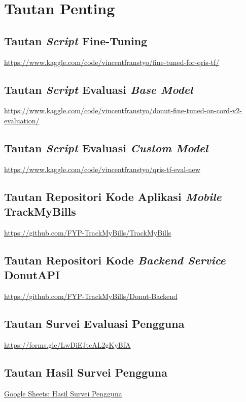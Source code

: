 \chapter{Tautan Penting}
\label{chapter:tautan-penting}

\section{Tautan \emph{Script} Fine-Tuning}
\href{https://www.kaggle.com/code/vincentfranstyo/fine-tuned-for-qris-tf/}{https://www.kaggle.com/code/vincentfranstyo/fine-tuned-for-qris-tf/}

\section{Tautan \emph{Script} Evaluasi \emph{Base Model}}
\href{https://www.kaggle.com/code/vincentfranstyo/donut-fine-tuned-on-cord-v2-evaluation/}{https://www.kaggle.com/code/vincentfranstyo/donut-fine-tuned-on-cord-v2-evaluation/}

\section{Tautan \emph{Script} Evaluasi \emph{Custom Model}}
\href{https://www.kaggle.com/code/vincentfranstyo/qris-tf-eval-new}{https://www.kaggle.com/code/vincentfranstyo/qris-tf-eval-new}

\section{Tautan Repositori Kode Aplikasi \emph{Mobile} TrackMyBills}
\href{https://github.com/FYP-TrackMyBills/TrackMyBills}{https://github.com/FYP-TrackMyBills/TrackMyBills}

\section{Tautan Repositori Kode \emph{Backend Service} DonutAPI}
\href{https://github.com/FYP-TrackMyBills/Donut-Backend}
{https://github.com/FYP-TrackMyBills/Donut-Backend}

\section{Tautan Survei Evaluasi Pengguna}
\href{https://forms.gle/LwDiEJtcAL2gKyBfA}{https://forms.gle/LwDiEJtcAL2gKyBfA}

\section{Tautan Hasil Survei Pengguna}
\href{https://docs.google.com/spreadsheets/d/1a2Q1Kio0whC7-fwUD3y7AQzv5Cw0PaTOwEdsp9prtck/edit?resourcekey=&gid=529123852#gid=529123852}{Google Sheets: Hasil Survei Pengguna}